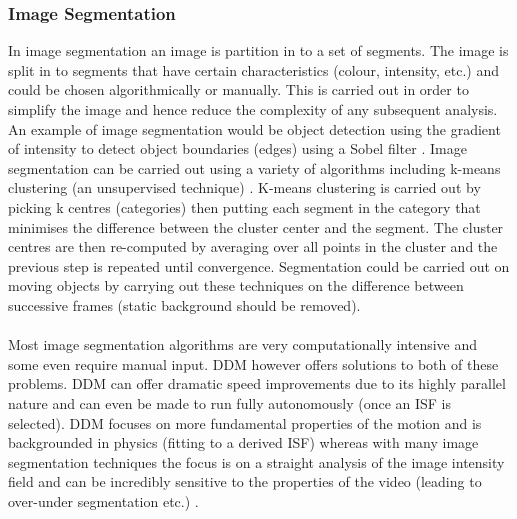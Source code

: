 \documentclass[11pt]{article}
\begin{document}
\subsubsection{Image Segmentation}
In image segmentation an image is partition in to a set of segments. The image is split in to segments that have certain characteristics (colour, intensity, etc.) and could be chosen algorithmically or manually. This is carried out in order to simplify the image and hence reduce the complexity of any subsequent analysis. \cite{computer_vision_book} An example of image segmentation would be object detection using the gradient of intensity to detect object boundaries (edges) using a Sobel filter \cite{sobel}. Image segmentation can be carried out using a variety of algorithms including k-means clustering (an unsupervised technique) \cite{segmentation_kmeans}. K-means clustering is carried out by picking k centres (categories) then putting each segment in the category that minimises the difference between the cluster center and the segment. The cluster centres are then re-computed by averaging over all points in the cluster and the previous step is repeated until convergence. Segmentation could be carried out on moving objects by carrying out these techniques on the difference between successive frames (static background should be removed).
\\\\
Most image segmentation algorithms are very computationally intensive and some even require manual input. DDM however offers solutions to both of these problems. DDM can offer dramatic speed improvements due to its highly parallel nature and can even be made to run fully autonomously (once an ISF is selected). DDM focuses on more fundamental properties of the motion and is backgrounded in physics (fitting to a derived ISF) whereas with many image segmentation techniques the focus is on a straight analysis of the image intensity field and can be incredibly sensitive to the properties of the video (leading to over-under segmentation etc.) \cite{computer_vision_book}. 
\end{document}
